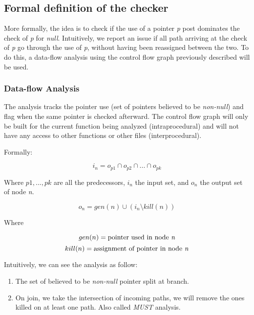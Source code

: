 \subsection{Formal definition of the checker}
\label{subsec:checker_formal_definition}
More formally, the idea is to check if the use of a pointer \emph{p} post dominates the check of \emph{p} for \emph{null}.
Intuitively, we report an issue if all path arriving at the check of \emph{p} go through the use of \emph{p}, without having been reassigned between the two. 
To do this, a data-flow analysis using the control flow graph previously described will be used.

\subsubsection{Data-flow Analysis}
\label{subsubsec:data_flow_analysis}

The analysis tracks the pointer use (set of pointers believed to be \emph{non-null}) and flag when the same pointer is checked afterward.
The control flow graph will only be built for the current function being analyzed (intraprocedural) and will not have any access to other functions or other files (interprocedural).

Formally:

\begin{equation}\label{eqn:dataflow1}
i_{n} = o_{p1}  \cap   o_{p2}  \cap  ... \cap   o_{pk}
\end{equation}

Where $p1, ..., pk$ are all the predecessors, $i_{n}$ the input set, and  $o_{n}$ the output set of node \emph{n}.

\begin{equation}\label{eqn:dataflow2}
o_{n} = gen(n)  \cup   (i_{n} \setminus kill(n))
\end{equation}

Where

\begin{equation}\label{eqn:dataflow3}
gen(n) =\text{pointer used in node \emph{n}}
\end{equation}
\begin{equation}\label{eqn:dataflow4}
kill(n) = \text{assignment of pointer in node \emph{n}}
\end{equation}

\pagebreak

Intuitively, we can see the analysis as follow:
\begin{enumerate}
	\item The set of believed to be \emph{non-null} pointer split at branch. \newline 
	\item On join, we take the intersection of incoming paths, we will remove the ones killed on at least one path. Also called \emph{MUST} analysis. \newline 
\end{enumerate}

